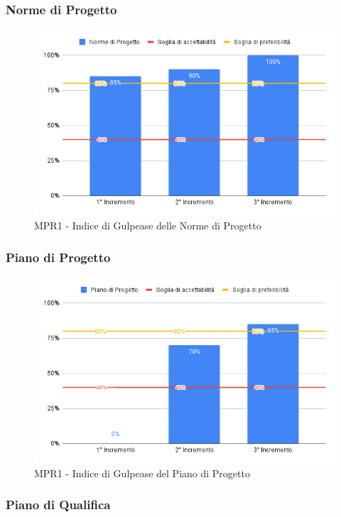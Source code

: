 \subsubsection{Norme di Progetto}

\begin{figure}[H]
	\centering
	\includegraphics[scale = 0.6]{sezioni/Images/NdP.png}
	\caption{MPR1 - Indice di Gulpease delle Norme di Progetto}
\end{figure}

\subsubsection{Piano di Progetto}

\begin{figure}[H]
	\centering
	\includegraphics[scale = 0.6]{sezioni/Images/PdP.png}
	\caption{MPR1 - Indice di Gulpease del Piano di Progetto}
\end{figure}

\subsubsection{Piano di Qualifica}

